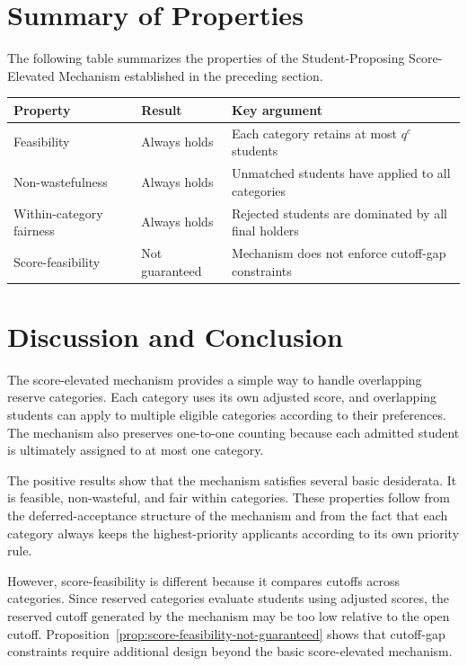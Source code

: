 \documentclass[10pt]{article}
\newcommand{\1}{\mathbf{1}}
\begin{document}
\section{Summary of Properties}

The following table summarizes the properties of the Student-Proposing Score-Elevated Mechanism established in the preceding section.

\begin{center}
\renewcommand{\arraystretch}{1.3}
\begin{tabular}{lll}
\toprule
\textbf{Property} & \textbf{Result} & \textbf{Key argument} \\
\midrule
Feasibility & Always holds & Each category retains at most $q^c$ students \\
Non-wastefulness & Always holds & Unmatched students have applied to all categories \\
Within-category fairness & Always holds & Rejected students are dominated by all final holders \\
Score-feasibility & Not guaranteed & Mechanism does not enforce cutoff-gap constraints \\
\bottomrule
\end{tabular}
\end{center}

\section{Discussion and Conclusion}

The score-elevated mechanism provides a simple way to handle overlapping reserve categories. Each category uses its own adjusted score, and overlapping students can apply to multiple eligible categories according to their preferences. The mechanism also preserves one-to-one counting because each admitted student is ultimately assigned to at most one category.

The positive results show that the mechanism satisfies several basic desiderata. It is feasible, non-wasteful, and fair within categories. These properties follow from the deferred-acceptance structure of the mechanism and from the fact that each category always keeps the highest-priority applicants according to its own priority rule.

However, score-feasibility is different because it compares cutoffs across categories. Since reserved categories evaluate students using adjusted scores, the reserved cutoff generated by the mechanism may be too low relative to the open cutoff. Proposition~\ref{prop:score-feasibility-not-guaranteed} shows that cutoff-gap constraints require additional design beyond the basic score-elevated mechanism.
\end{document}
